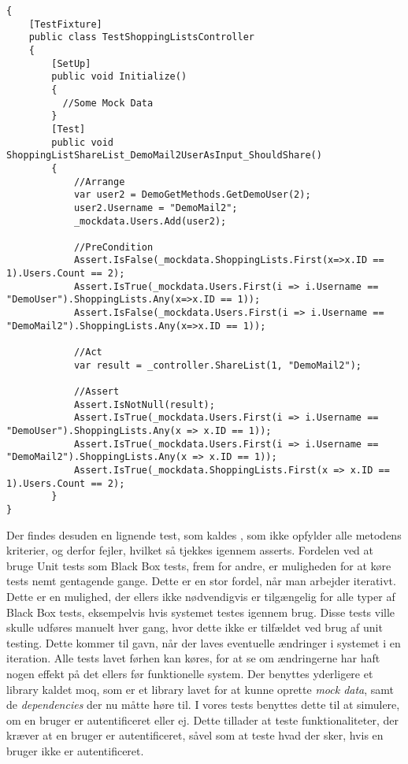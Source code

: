 \begin{lstlisting}[caption={Test for metoden \class{ShareList}.}, label=lsttest]
{
    [TestFixture]
    public class TestShoppingListsController
    {
    	[SetUp]
        public void Initialize()
        {
          //Some Mock Data
        }
        [Test]
        public void ShoppingListShareList_DemoMail2UserAsInput_ShouldShare()
        {
            //Arrange
            var user2 = DemoGetMethods.GetDemoUser(2);
            user2.Username = "DemoMail2";
            _mockdata.Users.Add(user2); 

            //PreCondition
            Assert.IsFalse(_mockdata.ShoppingLists.First(x=>x.ID == 1).Users.Count == 2);
            Assert.IsTrue(_mockdata.Users.First(i => i.Username == "DemoUser").ShoppingLists.Any(x=>x.ID == 1));
            Assert.IsFalse(_mockdata.Users.First(i => i.Username == "DemoMail2").ShoppingLists.Any(x=>x.ID == 1));

            //Act
            var result = _controller.ShareList(1, "DemoMail2");

            //Assert
            Assert.IsNotNull(result);
            Assert.IsTrue(_mockdata.Users.First(i => i.Username == "DemoUser").ShoppingLists.Any(x => x.ID == 1));
            Assert.IsTrue(_mockdata.Users.First(i => i.Username == "DemoMail2").ShoppingLists.Any(x => x.ID == 1));
            Assert.IsTrue(_mockdata.ShoppingLists.First(x => x.ID == 1).Users.Count == 2);
        }
}        
\end{lstlisting}

Der findes desuden en lignende test, som kaldes , som ikke opfylder alle metodens kriterier, og derfor fejler, hvilket så tjekkes igennem asserts.
Fordelen ved at bruge Unit tests som Black Box tests, frem for andre, er muligheden for at køre tests nemt gentagende gange.
Dette er en stor fordel, når man arbejder iterativt.
Dette er en mulighed, der ellers ikke nødvendigvis er tilgængelig for alle typer af Black Box tests, eksempelvis hvis systemet testes igennem brug.
Disse tests ville skulle udføres manuelt hver gang, hvor dette ikke er tilfældet ved brug af unit testing.
Dette kommer til gavn, når der laves eventuelle ændringer i systemet i en iteration.
Alle tests lavet førhen kan køres, for at se om ændringerne har haft nogen effekt på det ellers før funktionelle system. 
Der benyttes yderligere et library kaldet moq, som er et library lavet for at kunne oprette \textit{mock data}, samt de \textit{dependencies} der nu måtte høre til.
I vores tests benyttes dette til at simulere, om en bruger er autentificeret eller ej.
Dette tillader at teste funktionaliteter, der kræver at en bruger er autentificeret, såvel som at teste hvad der sker, hvis en bruger ikke er autentificeret.

